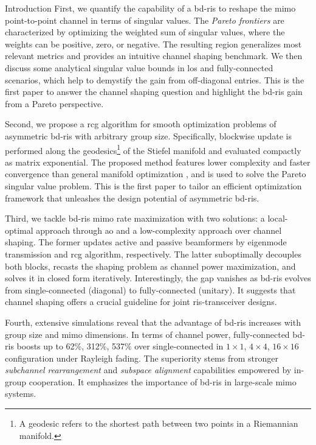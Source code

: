 \documentclass[journal]{IEEEtran}
\begin{document}
\begin{section}{Introduction}
	First, we quantify the capability of a \gls{bd}-\gls{ris} to reshape the \gls{mimo} point-to-point channel in terms of singular values.
	The \emph{Pareto frontiers} are characterized by optimizing the {weighted sum of singular values}, where the weights can be positive, zero, or negative.
	The resulting region generalizes most relevant metrics and provides an intuitive channel shaping benchmark.
	We then discuss some analytical singular value bounds in \gls{los} and fully-connected scenarios, which help to demystify the gain from off-diagonal entries.
	This is the first paper to answer the channel shaping question and highlight the \gls{bd}-\gls{ris} gain from a Pareto perspective.

	Second, we propose a \gls{rcg} algorithm for smooth optimization problems of asymmetric \gls{bd}-\gls{ris} with arbitrary group size.
	Specifically, blockwise update is performed along the geodesics\footnote{A geodesic refers to the shortest path between two points in a Riemannian manifold.} of the Stiefel manifold and evaluated compactly as matrix exponential.
	The proposed method features lower complexity and faster convergence than general manifold optimization \cite{Absil2009,Pan2022d}, and is used to solve the Pareto singular value problem.
	This is the first paper to tailor an efficient optimization framework that unleashes the design potential of asymmetric \gls{bd}-\gls{ris}.

	Third, we tackle \gls{bd}-\gls{ris} \gls{mimo} rate maximization with two solutions: a local-optimal approach through \gls{ao} and a low-complexity approach over channel shaping.
	The former updates active and passive beamformers by eigenmode transmission and \gls{rcg} algorithm, respectively.
	The latter suboptimally decouples both blocks, recasts the shaping problem as channel power maximization, and solves it in closed form iteratively.
	Interestingly, the gap vanishes as \gls{bd}-\gls{ris} evolves from single-connected (diagonal) to fully-connected (unitary).
	It suggests that channel shaping offers a crucial guideline for joint \gls{ris}-transceiver designs.


	Fourth, extensive simulations reveal that the advantage of \gls{bd}-\gls{ris} increases with group size and \gls{mimo} dimensions.
	In terms of channel power, fully-connected \gls{bd}-\gls{ris} boosts up to 62\%, 312\%, 537\% over single-connected in $1 \times 1$, $4 \times 4$, $16 \times 16$ configuration under Rayleigh fading.
	The superiority stems from stronger \emph{subchannel rearrangement} and \emph{subspace alignment} capabilities empowered by in-group cooperation.
	It emphasizes the importance of \gls{bd}-\gls{ris} in large-scale \gls{mimo} systems.
\end{section}
\end{document}
